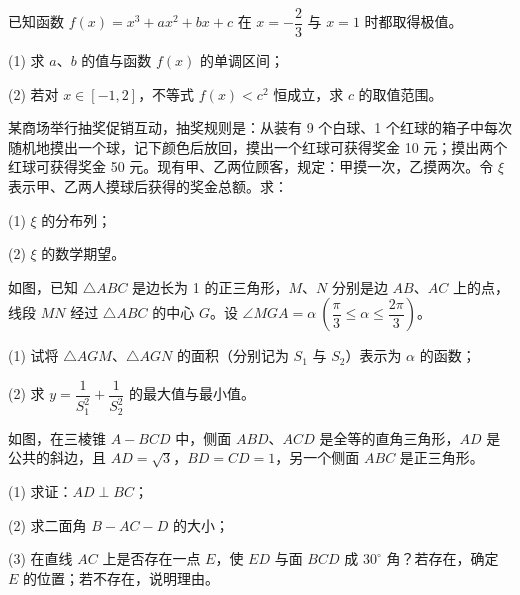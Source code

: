 \begin{question}
已知函数 $f(x)=x^3+ax^2+bx+c$ 在 $x=-\dfrac23$ 与 $x=1$ 时都取得极值。

(1) 求 $a\text{、}b$ 的值与函数 $f(x)$ 的单调区间；

(2) 若对 $x\in[-1,2]$，不等式 $f(x)<c^2$ 恒成立，求 $c$ 的取值范围。

\end{question}
\begin{question}
某商场举行抽奖促销互动，抽奖规则是：从装有 9 个白球、1 个红球的箱子中每次随机地摸出一个球，记下颜色后放回，摸出一个红球可获得奖金 10 元；摸出两个红球可获得奖金 50 元。现有甲、乙两位顾客，规定：甲摸一次，乙摸两次。令 $\xi$ 表示甲、乙两人摸球后获得的奖金总额。求：

(1) $\xi$ 的分布列；

(2) $\xi$ 的数学期望。

\Needspace{0.4\textheight}
\end{question}
\begin{question}
如图，已知 $\triangle ABC$ 是边长为 1 的正三角形，$M\text{、}N$ 分别是边 $AB\text{、}AC$ 上的点，线段 $MN$ 经过 $\triangle ABC$ 的中心 $G$。设 $\angle MGA=\alpha\ \left(\dfrac\pi3\leqslant\alpha\leqslant\dfrac{2\pi}3\right)$。

(1) 试将 $\triangle AGM\text{、}\triangle AGN$ 的面积（分别记为 $S_1$ 与 $S_2$）表示为 $\alpha$ 的函数；

(2) 求 $y=\dfrac1{S_1^2}+\dfrac1{S_2^2}$ 的最大值与最小值。
\nopagebreak[4]
\begin{center}\end{center}
\nopagebreak[4]
\Needspace{0.4\textheight}
\end{question}
\begin{question}
如图，在三棱锥 $A-BCD$ 中，侧面 $ABD\text{、}ACD$ 是全等的直角三角形，$AD$ 是公共的斜边，且 $AD=\sqrt3\text{，}BD=CD=1$，另一个侧面 $ABC$ 是正三角形。

(1) 求证：$AD\perp BC$；

(2) 求二面角 $B-AC-D$ 的大小；

(3) 在直线 $AC$ 上是否存在一点 $E$，使 $ED$ 与面 $BCD$ 成 $30^\circ$ 角？若存在，确定 $E$ 的位置；若不存在，说明理由。
\nopagebreak[4]
\begin{center}\end{center}
\nopagebreak[4]
\Needspace{0.4\textheight}
\end{question}

